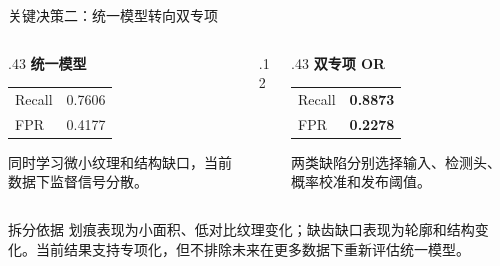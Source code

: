 \documentclass[aspectratio=169,10pt]{beamer}
\begin{document}
\begin{frame}{关键决策二：统一模型转向双专项}
  \begin{columns}[T,onlytextwidth]
    \begin{column}{.43\textwidth}
      \centering
      {\large\bfseries 统一模型}

      \vspace{.7em}
      \begin{tabular}{lr}
        Recall & 0.7606 \\
        FPR & 0.4177 \\
      \end{tabular}

      \vspace{1.0em}
      同时学习微小纹理和结构缺口，当前数据下监督信号分散。
    \end{column}
    \begin{column}{.12\textwidth}
      \centering\vspace{2em}{\color{seugold}\Huge$\Rightarrow$}
    \end{column}
    \begin{column}{.43\textwidth}
      \centering
      {\large\bfseries 双专项 OR}

      \vspace{.7em}
      \begin{tabular}{lr}
        Recall & \textbf{0.8873} \\
        FPR & \textbf{0.2278} \\
      \end{tabular}

      \vspace{1.0em}
      两类缺陷分别选择输入、检测头、概率校准和发布阈值。
    \end{column}
  \end{columns}

  \vfill
  \begin{block}{拆分依据}
    划痕表现为小面积、低对比纹理变化；缺齿缺口表现为轮廓和结构变化。当前结果支持专项化，但不排除未来在更多数据下重新评估统一模型。
  \end{block}
\end{frame}

\end{document}

